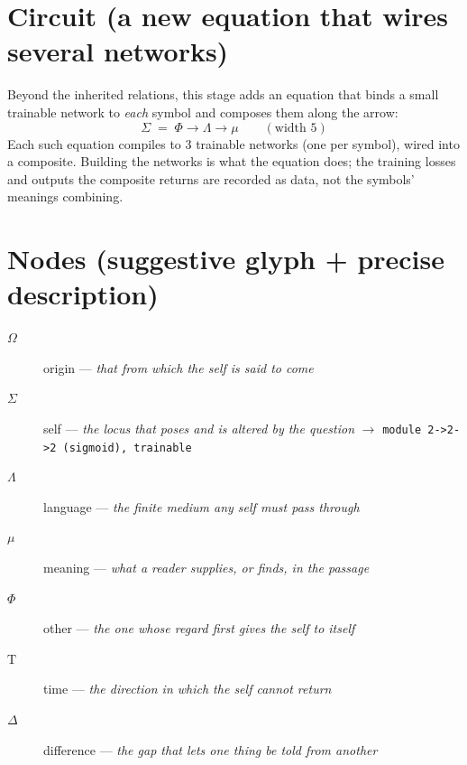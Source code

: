 \documentclass[11pt]{article}
\newcommand{\Tau}{\mathrm{T}}
\begin{document}
\section*{Circuit (a new equation that wires several networks)}Beyond the inherited relations, this stage adds an equation that binds a small trainable network to \emph{each} symbol and composes them along the arrow:\begin{equation*}\Sigma \;=\; \Phi \longrightarrow \Lambda \longrightarrow \mu \qquad (\text{width } 5)\end{equation*}Each such equation compiles to 3 trainable networks (one per symbol), wired into a composite. Building the networks is what the equation does; the training losses and outputs the composite returns are recorded as data, not the symbols' meanings combining.
\section*{Nodes (suggestive glyph + precise description)}
\begin{description}\item[$ \Omega $] origin --- \emph{that from which the self is said to come}
\item[$ \Sigma $] self --- \emph{the locus that poses and is altered by the question} \quad $\rightarrow$ \texttt{module 2->2->2 (sigmoid), trainable}
\item[$ \Lambda $] language --- \emph{the finite medium any self must pass through}
\item[$ \mu $] meaning --- \emph{what a reader supplies, or finds, in the passage}
\item[$ \Phi $] other --- \emph{the one whose regard first gives the self to itself}
\item[$ \Tau $] time --- \emph{the direction in which the self cannot return}
\item[$ \Delta $] difference --- \emph{the gap that lets one thing be told from another}\end{description}
\end{document}
